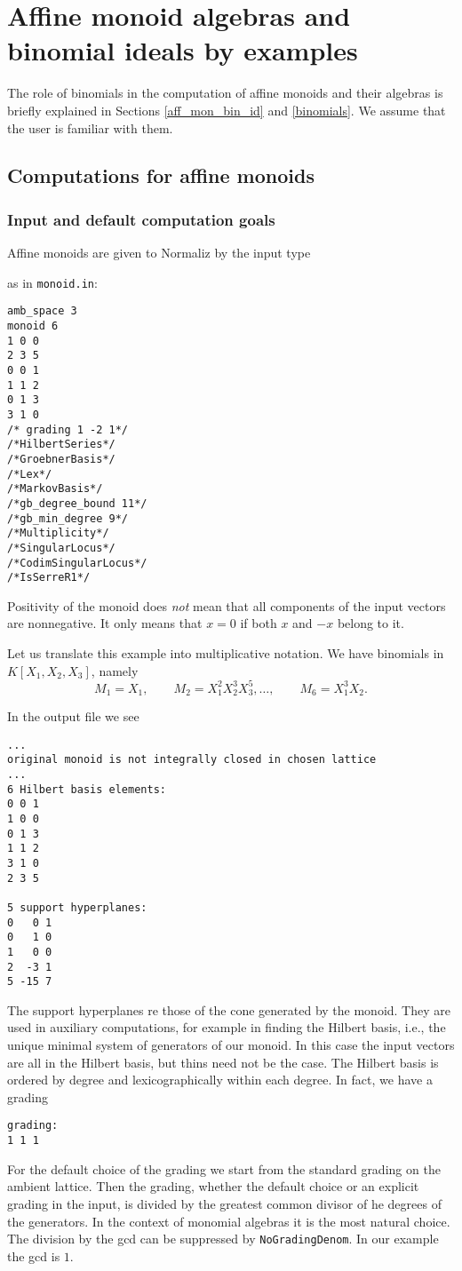 
\section{Affine monoid algebras and binomial ideals by examples}\label{AffMon}

The role of binomials in the computation of affine monoids and their algebras is briefly explained in Sections \ref{aff_mon_bin_id} and \ref{binomials}. We assume that the user is familiar with them.

\subsection{Computations for affine monoids}

\subsubsection{Input and default computation goals}\label{moninp_def}
Affine monoids are given to Normaliz by the input type 
\begin{itemize}
	\itemtt[monoid]
\end{itemize}
as in \verb|monoid.in|:
\begin{Verbatim}
amb_space 3
monoid 6
1 0 0
2 3 5
0 0 1
1 1 2
0 1 3
3 1 0
/* grading 1 -2 1*/
/*HilbertSeries*/
/*GroebnerBasis*/
/*Lex*/
/*MarkovBasis*/
/*gb_degree_bound 11*/
/*gb_min_degree 9*/
/*Multiplicity*/
/*SingularLocus*/
/*CodimSingularLocus*/
/*IsSerreR1*/
\end{Verbatim}
Positivity of the monoid does \emph{not} mean that all components of the input vectors are nonnegative. It only means that $x=0$ if both $x$ and $-x$ belong to it.

Let us translate this example into multiplicative notation. We have binomials in $K[X_1,X_2,X_3]$, namely 
$$
M_1 = X_1,\qquad M_2 = X_1^2X_2^3X_3^5,\dots, \qquad M_6 =X_1^3X_2.
$$

In the output file we see
\begin{Verbatim}
...
original monoid is not integrally closed in chosen lattice
...
6 Hilbert basis elements:
0 0 1
1 0 0
0 1 3
1 1 2
3 1 0
2 3 5

5 support hyperplanes:
0   0 1
0   1 0
1   0 0
2  -3 1
5 -15 7
\end{Verbatim}
The support hyperplanes re those of the cone generated by the monoid. They are used in auxiliary computations, for example in finding the Hilbert basis, i.e., the unique minimal system of generators of our monoid. In this case the input vectors are all in the Hilbert basis, but thins need not be the case. The Hilbert basis is ordered by degree and lexicographically within each degree. In fact, we have a grading
\begin{Verbatim}
grading:
1 1 1 
\end{Verbatim}
For the default choice of the grading we start from the standard grading on the ambient lattice. Then the grading, whether the default choice or an explicit grading in the input, is divided by the greatest common divisor of he degrees of the generators. In the context of monomial algebras it is the most natural choice. The division by the gcd can be suppressed by \verb|NoGradingDenom|. In our example the gcd is $1$.

